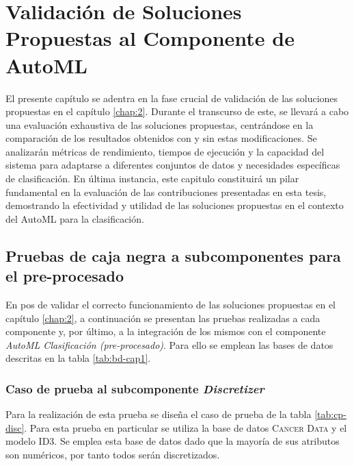 \chapter{Validación de Soluciones Propuestas al Componente de AutoML}\label{chap:3}
El presente capítulo se adentra en la fase crucial de validación de las soluciones propuestas en el capítulo \ref{chap:2}. Durante el transcurso de este, se llevará a cabo una evaluación exhaustiva de las soluciones propuestas, centrándose en la comparación de los resultados obtenidos con y sin estas modificaciones. Se analizarán métricas de rendimiento, tiempos de ejecución y la capacidad del sistema para adaptarse a diferentes conjuntos de datos y necesidades específicas de clasificación. En última instancia, este capitulo constituirá un pilar fundamental en la evaluación de las contribuciones presentadas en esta tesis, demostrando la efectividad y utilidad de las soluciones propuestas en el contexto del AutoML para la clasificación.

\section{Pruebas de caja negra a subcomponentes para el pre-procesado}
En pos de validar el correcto funcionamiento de las soluciones propuestas en el capítulo \ref{chap:2}, a continuación se presentan las pruebas realizadas a cada componente y, por último, a la integración de los mismos con el componente \textit{AutoML Clasificación (pre-procesado)}. Para ello se emplean las bases de datos descritas en la tabla \ref{tab:bd-cap1}.

\subsection{Caso de prueba al subcomponente \textit{Discretizer}}

Para la realización de esta prueba se diseña el caso de prueba de la tabla \ref{tab:cp-disc}. Para esta prueba en particular se utiliza la base de datos \textsc{Cancer Data} y el modelo ID3. Se emplea esta base de datos dado que la mayoría de sus atributos son numéricos, por tanto todos serán discretizados.

